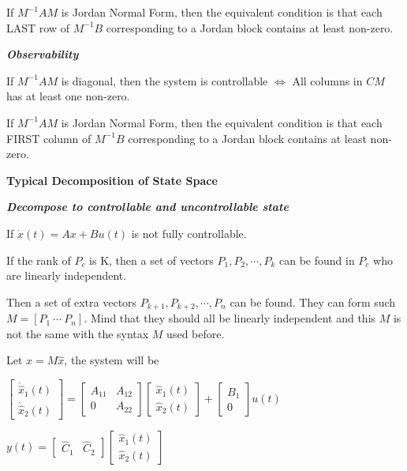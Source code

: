 \documentclass{article}
\newcommand{\bigtitle}[1]{
	\noindent
	\textbf{#1}
}
\newcommand{\smalltitle}[1]{
	\noindent
	\textbf{\textit{#1}}
}
\begin{document}
\begin{spacing}{1.2}
If $M^{-1}AM$ is Jordan Normal Form, then the equivalent condition is that each LAST row of $M^{-1}B$ corresponding to a Jordan block contains at least non-zero.

\smalltitle{Observability}

If $M^{-1}AM$ is diagonal, then the system is controllable $\Leftrightarrow$ All columns in $CM$ has at least one non-zero.

If $M^{-1}AM$ is Jordan Normal Form, then the equivalent condition is that each FIRST column of $M^{-1}B$ corresponding to a Jordan block contains at least non-zero.


\bigtitle{Typical Decomposition of State Space}

\smalltitle{Decompose to controllable and uncontrollable state}

If $\dot{x}(t)=A x+B u(t)$ is not fully controllable.

If the rank of $P_c$ is K, then a set of vectors $P_1, P_2, \cdots, P_k$ can be found in $P_c$ who are linearly independent. 

Then a set of extra vectors $P_{k+1}, P_{k+2}, \cdots, P_{n}$ can be found. They can form such $M = \left[ P_1 \ \cdots \ P_n \right]$.
Mind that they should all be linearly independent and this $M$ is not the same with the syntax $M$ used before.

Let $x=M \hat{x}$, the system will be 

$\left[ \begin{array}{c}{\dot{\hat{x}}_{1}(t)}
	                 \\
	{\dot{\hat{x}}_{2}(t)}
\end{array}\right]=\left[ \begin{array}{cc}{A_{11}} & {A_{12}} \\ {0} & {A_{22}}\end{array}\right] \left[ \begin{array}{c}{\hat{x}_{1}(t)} \\ {\hat{x}_{2}(t)}\end{array}\right]+\left[ \begin{array}{c}{B_{1}} \\ {0}\end{array}\right] u(t)$

$y(t)=\left[ \begin{array}{ll}{\hat{C}_{1}} & {\hat{C}_{2}}\end{array}\right] \left[ \begin{array}{l}{\hat{x}_{1}(t)} \\ {\hat{x}_{2}(t)}\end{array}\right]$


\end{spacing}
\end{document}
